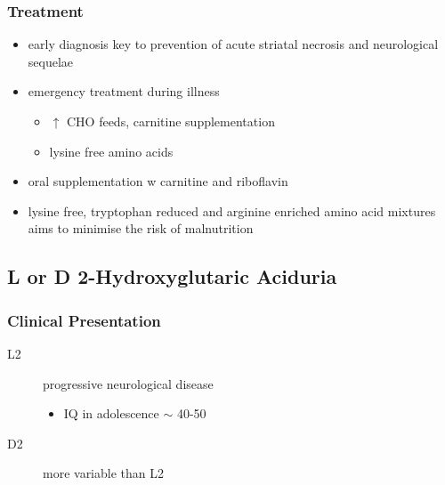 \documentclass[12pt]{scrartcl}
\begin{document}
\begin{center}
\begin{center}
\subsubsection{Treatment}
\label{sec:org5bc36bd}
\begin{itemize}
\item early diagnosis key to prevention of acute striatal necrosis and
neurological sequelae
\item emergency treatment during illness
\begin{itemize}
\item \(\uparrow\) CHO feeds, carnitine supplementation
\item lysine free amino acids
\end{itemize}
\item oral supplementation w carnitine and riboflavin
\item lysine free, tryptophan reduced and arginine enriched amino acid
mixtures aims to minimise the risk of malnutrition
\end{itemize}

\subsection{L or D 2-Hydroxyglutaric Aciduria}
\label{sec:orga3c37e8}
\subsubsection{Clinical Presentation}
\label{sec:org972a2fc}
\begin{description}
\item[{L2}] progressive neurological disease
\begin{itemize}
\item IQ in adolescence \(\sim\) 40-50
\end{itemize}
\item[{D2}] more variable than L2
\end{description}


\end{center}
\end{center}
\end{document}
